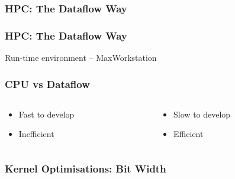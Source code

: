 \begin{frame}
  \frametitle{HPC: The Dataflow Way}
  \begin{figure}[!ht]
    \centering
    \def\svgwidth{0.7\linewidth}
    
  \end{figure}
\end{frame}

\begin{frame}
  \frametitle{HPC: The Dataflow Way}
  Run-time environment -- MaxWorkstation
  \begin{figure}[!ht]
    \centering
    \def\svgwidth{\linewidth}
    
  \end{figure}
\end{frame}


\begin{frame}
  \frametitle{CPU vs Dataflow}
  \begin{columns}
    \begin{column}{.5\linewidth}
      \begin{figure}[!ht]
        \centering
        \def\svgwidth{\linewidth}
        
      \end{figure}
      \begin{itemize}
      \item Fast to develop
      \item Inefficient
      \end{itemize}
    \end{column}
    \begin{column}{.5\linewidth}
      \begin{figure}[!ht]
        \centering
        \def\svgwidth{\linewidth}
        
      \end{figure}
      \begin{itemize}
      \item Slow to develop
      \item Efficient
      \end{itemize}
    \end{column}
  \end{columns}
\end{frame}

\begin{frame}[fragile]
  \frametitle{Kernel Optimisations: Bit Width}
      \begin{figure}[!ht]
        \centering
        \def\svgwidth{.7\linewidth}
        
      \end{figure}
\end{frame}

